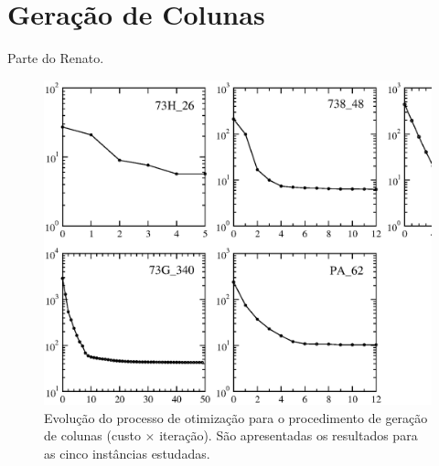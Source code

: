 
\section{Geração de Colunas}
\label{sec:resultados_cg}

Parte do Renato.

\begin{figure}[htbp]
	\begin{center}
		\includegraphics[scale=0.5]{fig/cg_results.eps}
		\caption{Evolução do processo de otimização para o procedimento de geração de colunas (custo 
		$\times$ iteração). São apresentadas os resultados para as cinco instâncias estudadas.}
		\label{fig:cg_results}
	\end{center}
\end{figure}

\begin{table}[ht]
\begin{center}
\caption{Resultados do processo de otimização para a geração de colunas.}
\label{tab:cg}
\end{center}
\end{table}



